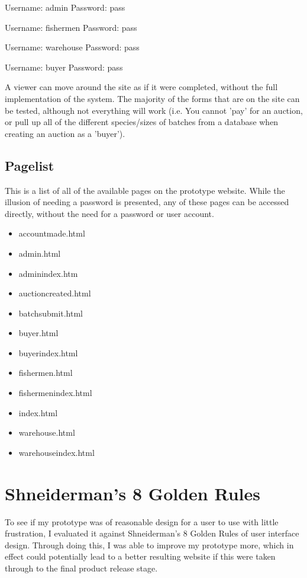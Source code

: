 \documentclass{article}
\begin{document}
Username: admin
Password: pass

Username: fishermen
Password: pass

Username: warehouse
Password: pass

Username: buyer
Password: pass

A viewer can move around the site as if it were completed, without the full implementation of the system. The majority of the forms that are on the site can be tested, although not everything will work (i.e. You cannot 'pay' for an auction, or pull up all of the different species/sizes of batches from a database when creating an auction as a 'buyer').

\subsection{Pagelist}
This is a list of all of the available pages on the prototype website. While the illusion of needing a password is presented, any of these pages can be accessed directly, without the need for a password or user account.
\begin{itemize}
	\item{accountmade.html}
\item{admin.html}
\item{adminindex.htm}
\item{auctioncreated.html}
\item{batchsubmit.html}
\item{buyer.html}
\item{buyerindex.html}
\item{fishermen.html}
\item{fishermenindex.html}
\item{index.html}
\item{warehouse.html}
\item{warehouseindex.html}
\end{itemize}

\clearpage


\section{Shneiderman’s 8 Golden Rules}
To see if my prototype was of reasonable design for a user to use with little frustration, I evaluated it against Shneiderman's 8 Golden Rules of user interface design\cite{8r}. Through doing this, I was able to improve my prototype more, which in effect could potentially lead to a better resulting website if this were taken through to the final product release stage.
\end{document}
